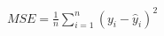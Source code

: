 \documentclass[preview]{standalone}
\begin{document}
\begin{align*}
MSE = \frac{1}{n} \sum_{i=1}^{n} (y_i - \hat{y}_i)^2
\end{align*}
\end{document}
